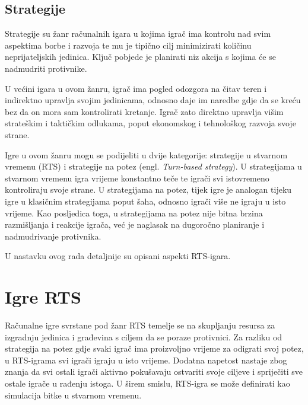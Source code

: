 \documentclass[times, utf8, zavrsni, numeric]{fer}
\begin{document}
\section{Strategije}

\par Strategije su žanr računalnih igara u kojima igrač ima kontrolu nad svim aspektima borbe i razvoja te mu je tipično cilj minimizirati količinu neprijateljskih jedinica.
Ključ pobjede je planirati niz akcija s kojima će se nadmudriti protivnike.

\par U većini igara u ovom žanru, igrač ima pogled odozgora na čitav teren i indirektno upravlja svojim jedinicama, odnosno daje im naredbe gdje da se kreću bez da on mora sam kontrolirati kretanje.
Igrač zato direktno upravlja višim strateškim i taktičkim odlukama, poput ekonomskog i tehnološkog razvoja svoje strane.

\par Igre u ovom žanru mogu se podijeliti u dvije kategorije: strategije u stvarnom vremenu (RTS) i strategije na potez (engl. \textit{Turn-based strategy}).
U strategijama u stvarnom vremenu igra vrijeme konstantno teče te igrači svi istovremeno kontroliraju svoje strane.
U strategijama na potez, tijek igre je analogan tijeku igre u klasičnim strategijama poput šaha, odnosno igrači više ne igraju u isto vrijeme.
Kao posljedica toga, u strategijama na potez nije bitna brzina razmišljanja i reakcije igrača, već je naglasak na dugoročno planiranje i nadmudrivanje protivnika.

\par U nastavku ovog rada detaljnije su opisani aspekti RTS-igara.

\chapter{Igre RTS}\label{ch:rtsGames}

\par Računalne igre svrstane pod žanr RTS temelje se na skupljanju resursa za izgradnju jedinica i građevina s ciljem da se poraze protivnici. 
Za razliku od strategija na potez gdje svaki igrač ima proizvoljno vrijeme za odigrati svoj potez, u RTS-igrama svi igrači igraju u isto vrijeme.
Dodatna napetost nastaje zbog znanja da svi ostali igrači aktivno pokušavaju ostvariti svoje ciljeve i spriječiti sve ostale igrače u rađenju istoga.
U širem smislu, RTS-igra se može definirati kao simulacija bitke u stvarnom vremenu.
\end{document}
